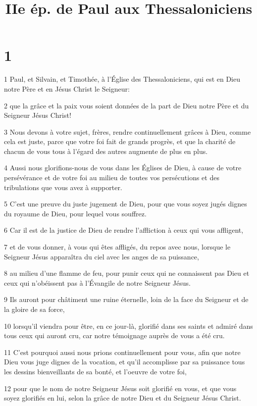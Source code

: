

\title{IIe ép. de Paul aux Thessaloniciens}


\chapter{1}

\par 1 Paul, et Silvain, et Timothée, à l'Église des Thessaloniciens, qui est en Dieu notre Père et en Jésus Christ le Seigneur:
\par 2 que la grâce et la paix vous soient données de la part de Dieu notre Père et du Seigneur Jésus Christ!
\par 3 Nous devons à votre sujet, frères, rendre continuellement grâces à Dieu, comme cela est juste, parce que votre foi fait de grands progrès, et que la charité de chacun de vous tous à l'égard des autres augmente de plus en plus.
\par 4 Aussi nous glorifions-nous de vous dans les Églises de Dieu, à cause de votre persévérance et de votre foi au milieu de toutes vos persécutions et des tribulations que vous avez à supporter.
\par 5 C'est une preuve du juste jugement de Dieu, pour que vous soyez jugés dignes du royaume de Dieu, pour lequel vous souffrez.
\par 6 Car il est de la justice de Dieu de rendre l'affliction à ceux qui vous affligent,
\par 7 et de vous donner, à vous qui êtes affligés, du repos avec nous, lorsque le Seigneur Jésus apparaîtra du ciel avec les anges de sa puissance,
\par 8 au milieu d'une flamme de feu, pour punir ceux qui ne connaissent pas Dieu et ceux qui n'obéissent pas à l'Évangile de notre Seigneur Jésus.
\par 9 Ils auront pour châtiment une ruine éternelle, loin de la face du Seigneur et de la gloire de sa force,
\par 10 lorsqu'il viendra pour être, en ce jour-là, glorifié dans ses saints et admiré dans tous ceux qui auront cru, car notre témoignage auprès de vous a été cru.
\par 11 C'est pourquoi aussi nous prions continuellement pour vous, afin que notre Dieu vous juge dignes de la vocation, et qu'il accomplisse par sa puissance tous les dessins bienveillants de sa bonté, et l'oeuvre de votre foi,
\par 12 pour que le nom de notre Seigneur Jésus soit glorifié en vous, et que vous soyez glorifiés en lui, selon la grâce de notre Dieu et du Seigneur Jésus Christ.

